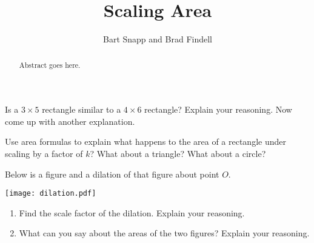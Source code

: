 \documentclass{ximera}
\title{Scaling Area}
\author{Bart Snapp and Brad Findell}
\begin{document}
\begin{abstract}
Abstract goes here.  
\end{abstract}
\maketitle


\begin{problem}
Is a $3\times 5$ rectangle similar to a $4\times 6$ rectangle?  Explain your reasoning.  Now come up with another explanation. 
\end{problem}

\vspace{.5in} 

\begin{problem}
Use area formulas to explain what happens to the area of a rectangle under scaling by a factor of $k$?  What about a triangle?  What about a circle?  
\end{problem}

\begin{problem}
Below is a figure and a dilation of that figure about point $O$.  
\begin{image}
\texttt{[image: dilation.pdf]}
\end{image}
\begin{enumerate}
\item Find the scale factor of the dilation.  Explain your reasoning. 
\item What can you say about the areas of the two figures?  Explain your reasoning. 
\end{enumerate}
\end{problem}


\end{document}
